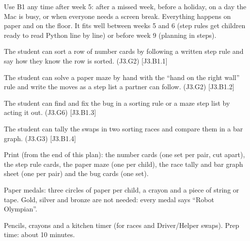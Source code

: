 
\begin{teachernote}
Use B1 any time after week 5: after a missed week, before a holiday, on a day the Mac is busy, or when everyone needs a screen break. Everything happens on paper and on the floor. It fits well between weeks 5 and 6 (step rules get children ready to read Python line by line) or before week 9 (planning in steps).
\end{teachernote}

\begin{objectives}
  \item The student can sort a row of number cards by following a written step rule and say how they know the row is sorted. (J3.G2) [J3.B1.1]
  \item The student can solve a paper maze by hand with the \enquote{hand on the right wall} rule and write the moves as a step list a partner can follow. (J3.G2) [J3.B1.2]
  \item The student can find and fix the bug in a sorting rule or a maze step list by acting it out. (J3.G6) [J3.B1.3]
  \item The student can tally the swaps in two sorting races and compare them in a bar graph. (J3.G3) [J3.B1.4]
\end{objectives}

\begin{materials}
  \item Print (from the end of this plan): the number cards (one set per pair, cut apart), the step rule cards, the paper maze (one per child), the race tally and bar graph sheet (one per pair) and the bug cards (one set).
  \item Paper medals: three circles of paper per child, a crayon and a piece of string or tape. Gold, silver and bronze are not needed: every medal says \enquote{Robot Olympian}.
  \item Pencils, crayons and a kitchen timer (for races and Driver/Helper swaps). Prep time: about 10 minutes.
\end{materials}

